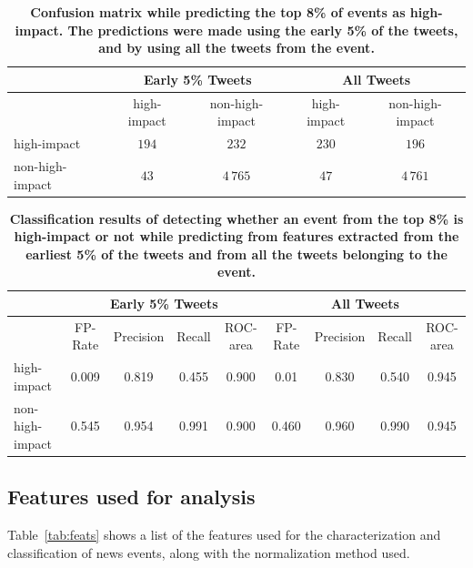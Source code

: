 \documentclass[10pt,letterpaper]{article}
\begin{document}
\begin{table}
  \centering
  \begin{tabular}{lcc|cc}
    \toprule
    \multirow{2}{*}{ }& \multicolumn{2}{c}{Early 5\% Tweets} & \multicolumn{2}{c}{All Tweets} \\
    \midrule
    & high-impact & non-high-impact & high-impact & non-high-impact \\
    high-impact & $194$ & $232$ & $230$ & $196$\\
    non-high-impact & $43$ & $4\,765$ & $47$ & $4\,761$ \\
    \bottomrule
  \end{tabular}
  \caption{\textbf{Confusion matrix while predicting the top 8\% of events
      as high-impact.  The predictions were made using the early 5\% of the tweets, and by using
      all the tweets from the event.}}
  \label{tab:confusion_matrix}
\end{table}
\begin{table}

  \centering
  {\small
    \begin{tabular}{lcccc|cccc}
      \toprule
      & \multicolumn{4}{c}{Early 5\% Tweets} & \multicolumn{4}{c}{All Tweets} \\
      \midrule
      & FP-Rate & Precision & Recall & ROC-area & FP-Rate & Precision & Recall & ROC-area \\
      high-impact & 0.009 & 0.819 & 0.455 & 0.900 & 0.01 & 0.830 & 0.540 & 0.945 \\
      non-high-impact & 0.545 & 0.954 & 0.991 & 0.900 &  0.460 & 0.960 & 0.990 & 0.945 \\
      \bottomrule
    \end{tabular}
  }
  \caption{\textbf{Classification results of detecting whether an event from the top 8\% is high-impact or not
      while predicting from features extracted from the earliest 5\% of the tweets and from all the tweets belonging to the event.}}
  \label{tab:classification_results}
\end{table}

\subsection{Features used for analysis}

Table~\ref{tab:feats} shows a list of the features used for the
characterization and classification of news events, along with the
normalization method used.
\end{document}
